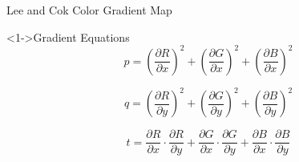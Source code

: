 \documentclass[serif]{beamer}
\begin{document}
\begin{frame}[c]{\sc Lee and Cok Color Gradient Map}

\begin{block}<1->{Gradient Equations}
\begin{equation}
p = \left( \frac{\partial R}{\partial x} \right)^{2} +
	\left( \frac{\partial G}{\partial x} \right)^{2} +
	\left( \frac{\partial B}{\partial x} \right)^{2}
\label{ColorGradientP}
\end{equation}

\begin{equation}
q = \left( \frac{\partial R}{\partial y} \right)^{2} +
	\left( \frac{\partial G}{\partial y} \right)^{2} +
	\left( \frac{\partial B}{\partial y} \right)^{2}
\label{ColorGradientQ}
\end{equation}

\begin{equation}
t = \frac{\partial R}{\partial x}\cdot\frac{\partial R}{\partial y} +
	\frac{\partial G}{\partial x}\cdot\frac{\partial G}{\partial y} +
	\frac{\partial B}{\partial x}\cdot\frac{\partial B}{\partial y}
\label{ColorGradientT}
\end{equation}
\end{block}




\end{frame}
\end{document}
